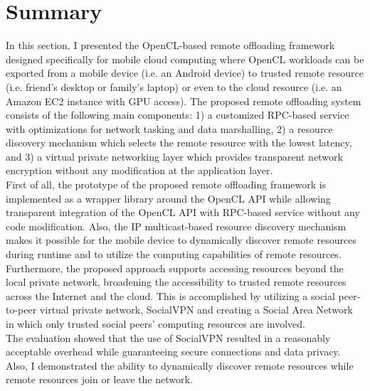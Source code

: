 \section{Summary} 
\label{offloading:summary}
In this section, I presented the OpenCL-based remote offloading
framework designed specifically for mobile cloud computing where OpenCL
workloads can be exported from a mobile device (i.e. an Android device)
to trusted remote resource (i.e. friend's desktop or family's laptop) or
even to the cloud resource (i.e. an Amazon EC2 instance with GPU
access).
%
The proposed remote offloading system consists of the following main
components: 1) a customized RPC-based service with optimizations for
network tasking and data marshalling, 2) a resource discovery mechanism
which selects the remote resource with the lowest latency, and 3) a
virtual private networking layer which provides transparent network
encryption without any modification at the application layer.\\
%
First of all, the prototype of the proposed remote offloading framework is implemented
as a wrapper library around the OpenCL API while allowing transparent
integration of the OpenCL API with RPC-based service without any code
modification.
%
Also, the IP multicast-based resource discovery mechanism makes it possible
for the mobile device to dynamically discover remote resources during
runtime and to utilize the computing capabilities of remote resources.
%
Furthermore, the proposed approach supports accessing resources beyond
the local private network, broadening the accessibility to trusted
remote resources across the Internet and the cloud.
%
This is accomplished by utilizing a social peer-to-peer virtual private
network, SocialVPN and creating a Social Area Network in which only
trusted social peers' computing resources are involved.\\
%
The evaluation showed that the use of SocialVPN resulted in a reasonably
acceptable overhead while guaranteeing secure connections and data
privacy.
%
Also, I demonstrated the ability to dynamically discover remote
resources while remote resources join or leave the network.
%
 
